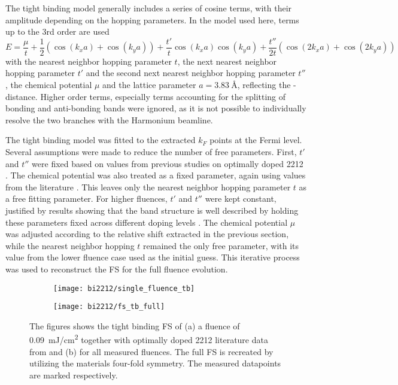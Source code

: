 The tight binding model generally includes a series of cosine terms, with their amplitude depending on the hopping parameters.
In the model used here, terms up to the 3rd order are used
\begin{equation}
	E = \frac{\mu}{t} + \frac{1}{2} \left(\cos(k_xa)+\cos(k_ya)\right) + \frac{t'}{t} \cos(k_xa)\cos(k_ya) + \frac{t''}{2t} \left(\cos(2k_xa)+\cos(2k_ya)\right)
\end{equation}
with the nearest neighbor hopping parameter $t$, the next nearest neighbor hopping parameter $t'$ and the second next nearest neighbor hopping parameter $t''$, the chemical potential $\mu$ and the lattice parameter $a=\qty{3.83}{\angstrom}$, reflecting the - distance.
Higher order terms, especially terms accounting for the splitting of bonding and anti-bonding bands were ignored, as it is not possible to individually resolve the two branches with the Harmonium beamline.

The tight binding model was fitted to the extracted $k_F$ points at the Fermi level.
Several assumptions were made to reduce the number of free parameters.
First, $t'$ and $t''$ were fixed based on values from previous studies on optimally doped 2212 \cite{kondo_hole-concentration_2004}.
The chemical potential was also treated as a fixed parameter, again using values from the literature \cite{kondo_hole-concentration_2004}.
This leaves only the nearest neighbor hopping parameter $t$ as a free fitting parameter.
For higher fluences, $t'$ and $t''$ were kept constant, justified by results showing that the band structure is well described by holding these parameters fixed across different doping levels \cite{drozdov_phase_2018}.
The chemical potential $\mu$ was adjusted according to the relative shift extracted in the previous section, while the nearest neighbor hopping $t$ remained the only free parameter, with its value from the lower fluence case used as the initial guess.
This iterative process was used to reconstruct the FS for the full fluence evolution.

\begin{figure}[b!]
	\centering
	\begin{subfigure}[t!]{0.33\textwidth}
		\texttt{[image: bi2212/single\_fluence\_tb]}
		\caption{}
	\end{subfigure}
	\begin{subfigure}[t!]{0.33\textwidth}
		\texttt{[image: bi2212/fs\_tb\_full]}
		\caption{}
	\end{subfigure}
	\caption{The figures shows the tight binding FS of (a) a fluence of \qty{0.09}{\milli\joule/\centi\meter\squared} together with optimally doped 2212 literature data from \cite{kondo_hole-concentration_2004} and (b) for all measured fluences. The full FS is recreated by utilizing the materials four-fold symmetry. The measured datapoints are marked respectively.}
	\label{fig:fs_tb}
\end{figure}

